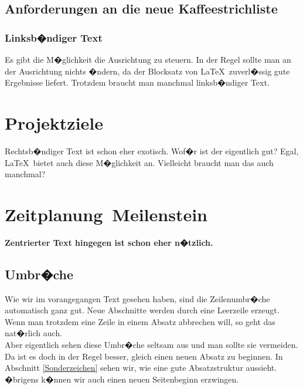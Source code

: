 \documentclass[11pt,a4paper]{article} %
\begin{document}
\subsection{Anforderungen an die neue Kaffeestrichliste}
\label{Ausrichtung}

\subsubsection{Linksb�ndiger Text}

\begin{flushleft}
Es gibt die M�glichkeit die Ausrichtung zu steuern. In der Regel sollte man an der Ausrichtung nichts �ndern, da der Blocksatz von \LaTeX\ zuverl�ssig gute Ergebnisse liefert. Trotzdem braucht man manchmal linksb�ndiger Text.
\end{flushleft}

\section{Projektziele\ }

\begin{flushright}
Rechtsb�ndiger Text ist schon eher exotisch. Wof�r ist der eigentlich gut? Egal, \LaTeX\ bietet auch diese M�glichkeit an. Vielleicht braucht man das auch manchmal?
\end{flushright}


\section{Zeitplanung\ Meilenstein}

\begin{center}
\begin{large}
\textbf{Zentrierter Text hingegen ist schon eher n�tzlich.}
\end{large}
\end{center}


\subsection{Umbr�che}
\label{Umbrueche}

Wie wir im vorangegangen Text gesehen haben, sind die Zeilenumbr�che automatisch ganz gut. Neue Abschnitte werden durch eine Leerzeile erzeugt. Wenn man trotzdem eine Zeile in einem Absatz abbrechen will, so geht das nat�rlich auch. \\  Aber eigentlich sehen diese Umbr�che seltsam aus und man sollte sie vermeiden. Da ist es doch in der Regel besser, gleich einen neuen Absatz zu beginnen. In Abschnitt \ref{Sonderzeichen} sehen wir, wie eine gute Absatzstruktur aussieht. �brigens k�nnen wir auch einen neuen Seitenbeginn erzwingen.
\end{document}
